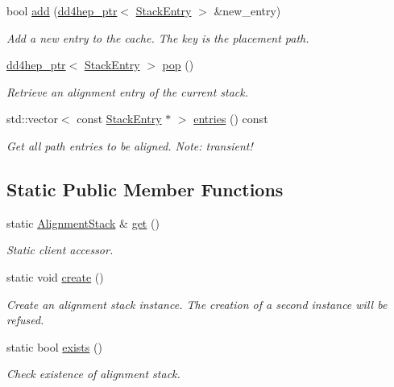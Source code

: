 \begin{DoxyCompactItemize}
bool \hyperlink{class_d_d4hep_1_1_alignments_1_1_alignment_stack_a16d69902ec4ebd8efe8c039d033f9e7b}{add} (\hyperlink{class_d_d4hep_1_1dd4hep__ptr}{dd4hep\+\_\+ptr}$<$ \hyperlink{struct_d_d4hep_1_1_alignments_1_1_alignment_stack_1_1_stack_entry}{Stack\+Entry} $>$ \&new\+\_\+entry)
\begin{DoxyCompactList}\small\item\em Add a new entry to the cache. The key is the placement path. \end{DoxyCompactList}\item 
\hyperlink{class_d_d4hep_1_1dd4hep__ptr}{dd4hep\+\_\+ptr}$<$ \hyperlink{struct_d_d4hep_1_1_alignments_1_1_alignment_stack_1_1_stack_entry}{Stack\+Entry} $>$ \hyperlink{class_d_d4hep_1_1_alignments_1_1_alignment_stack_aa140239531cbb98a7dde1d8af1f69877}{pop} ()
\begin{DoxyCompactList}\small\item\em Retrieve an alignment entry of the current stack. \end{DoxyCompactList}\item 
std\+::vector$<$ const \hyperlink{struct_d_d4hep_1_1_alignments_1_1_alignment_stack_1_1_stack_entry}{Stack\+Entry} $\ast$ $>$ \hyperlink{class_d_d4hep_1_1_alignments_1_1_alignment_stack_a57fcc9686b899679e7848b61e1baca72}{entries} () const
\begin{DoxyCompactList}\small\item\em Get all path entries to be aligned. Note\+: transient! \end{DoxyCompactList}\end{DoxyCompactItemize}
\subsection*{Static Public Member Functions}
\begin{DoxyCompactItemize}
\item 
static \hyperlink{class_d_d4hep_1_1_alignments_1_1_alignment_stack}{Alignment\+Stack} \& \hyperlink{class_d_d4hep_1_1_alignments_1_1_alignment_stack_aa39f02a46ed00baec0b3a09e42e3af1c}{get} ()
\begin{DoxyCompactList}\small\item\em Static client accessor. \end{DoxyCompactList}\item 
static void \hyperlink{class_d_d4hep_1_1_alignments_1_1_alignment_stack_a1244b4fa8cde1f3991957f689810ae4c}{create} ()
\begin{DoxyCompactList}\small\item\em Create an alignment stack instance. The creation of a second instance will be refused. \end{DoxyCompactList}\item 
static bool \hyperlink{class_d_d4hep_1_1_alignments_1_1_alignment_stack_aa2cbfdbfcd9a294c3f5487e5bf248b6a}{exists} ()
\begin{DoxyCompactList}\small\item\em Check existence of alignment stack. \end{DoxyCompactList}\end{DoxyCompactItemize}
